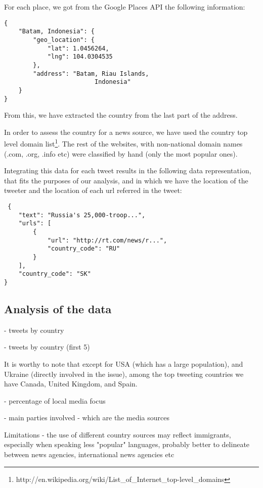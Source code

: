 \documentclass{acm_proc_10ptArticle-sp}
\begin{document}
For each place, we got from the Google Places API the following information: 
\begin{verbatim}
{
    "Batam, Indonesia": {
        "geo_location": {
            "lat": 1.0456264,
            "lng": 104.0304535
        },
        "address": "Batam, Riau Islands, 
                         Indonesia"
    }
}
\end{verbatim}

From this, we have extracted the country from the last part of the address.

In order to assess the country for a news source, we have used the country top level domain list\footnote{http://en.wikipedia.org/wiki/List\_of\_Internet\_top-level\_domains}. The rest of the websites, with non-national domain names (.com, .org, .info etc) were classified by hand (only the most popular ones). 

Integrating this data for each tweet results in the following data representation, that fits the purposes of our analysis, and in which we have the location of the tweeter and the location of each url referred in the tweet:

\begin{verbatim}
 {
    "text": "Russia's 25,000-troop...",
    "urls": [
        {
            "url": "http://rt.com/news/r...",
            "country_code": "RU"
        }
    ],
    "country_code": "SK"
}
\end{verbatim}

\subsection{Analysis of the data}



- tweets by country

- tweets by country (first 5)

It is worthy to note that except for USA (which has a large population), and Ukraine (directly involved in the issue), among the top tweeting countries we have Canada, United Kingdom, and Spain. 

- percentage of local media focus

- main parties involved - which are the media sources

Limitations - the use of different country sources may reflect immigrants, especially when speaking less "popular" languages, probably better to delineate between news agencies, international news agencies etc




\end{document}
